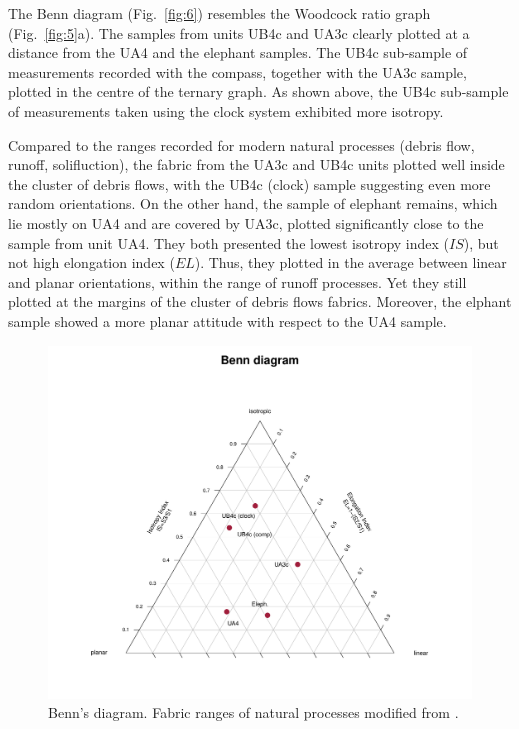 \documentclass[preprint,authoryear,times]{elsarticle} %
\begin{document}
The Benn diagram (Fig.~\ref{fig:6}) resembles the Woodcock ratio graph (Fig.~\ref{fig:5}a). The samples from units UB4c and UA3c clearly plotted at a distance from the UA4 and the elephant samples. The UB4c sub-sample of measurements recorded with the compass, together with the UA3c sample, plotted in the centre of the ternary graph. As shown above, the UB4c sub-sample of measurements taken using the clock system exhibited more isotropy.

Compared to the ranges recorded for modern natural processes (debris flow, runoff, solifluction), the fabric from the UA3c and UB4c units plotted well inside the cluster of debris flows, with the UB4c (clock) sample suggesting even more random orientations. On the other hand, the sample of elephant remains, which lie mostly on UA4 and are covered by UA3c, plotted significantly close to the sample from unit UA4. They both presented the lowest isotropy index ($IS$), but not high elongation index ($EL$). Thus, they plotted in the average between linear and planar orientations, within the range of runoff processes. Yet they still plotted at the margins of the cluster of debris flows fabrics. Moreover, the elphant sample showed a more planar attitude with respect to the UA4 sample.

\begin{figure}[]
  \centering
  \includegraphics[width=1\textwidth]{../artwork/Fig7.pdf}
  \caption{Benn's diagram. Fabric ranges of natural processes modified from \cite{Bertran1997,Lenoble2004}.}
  \label{fig:7}
\end{figure}
\end{document}
